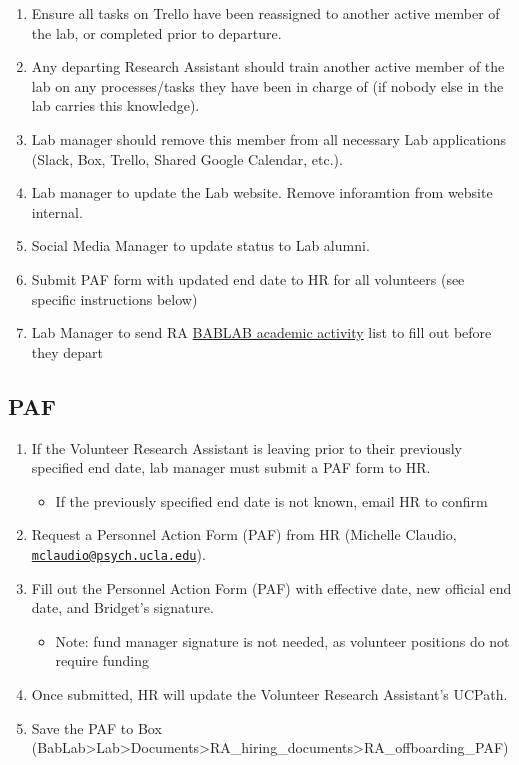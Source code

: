 \documentclass[]{book}
\providecommand{\tightlist}{%
  \setlength{\itemsep}{0pt}\setlength{\parskip}{0pt}}
\begin{document}
\begin{enumerate}
\def\labelenumi{\arabic{enumi}.}
\tightlist
\item
  Ensure all tasks on Trello have been reassigned to another active member of the lab, or completed prior to departure.
\item
  Any departing Research Assistant should train another active member of the lab on any processes/tasks they have been in charge of (if nobody else in the lab carries this knowledge).
\item
  Lab manager should remove this member from all necessary Lab applications (Slack, Box, Trello, Shared Google Calendar, etc.).
\item
  Lab manager to update the Lab website. Remove inforamtion from website internal.
\item
  Social Media Manager to update status to Lab alumni.
\item
  Submit PAF form with updated end date to HR for all volunteers (see specific instructions below)
\item
  Lab Manager to send RA \href{https://docs.google.com/spreadsheets/d/1BDrPZkQR2k0A2yIzCgjrRj-ve8a-tWYQdN2QSSsppbQ/edit?usp=sharing}{BABLAB academic activity} list to fill out before they depart
\end{enumerate}

\hypertarget{paf}{%
\subsection{PAF}\label{paf}}

\begin{enumerate}
\def\labelenumi{\arabic{enumi}.}
\tightlist
\item
  If the Volunteer Research Assistant is leaving prior to their previously specified end date, lab manager must submit a PAF form to HR.

  \begin{itemize}
  \tightlist
  \item
    If the previously specified end date is not known, email HR to confirm
  \end{itemize}
\item
  Request a Personnel Action Form (PAF) from HR (Michelle Claudio, \href{mailto:mclaudio@psych.ucla.edu}{\nolinkurl{mclaudio@psych.ucla.edu}}).
\item
  Fill out the Personnel Action Form (PAF) with effective date, new official end date, and Bridget's signature.

  \begin{itemize}
  \tightlist
  \item
    Note: fund manager signature is not needed, as volunteer positions do not require funding
  \end{itemize}
\item
  Once submitted, HR will update the Volunteer Research Assistant's UCPath.
\item
  Save the PAF to Box (BabLab\textgreater{}Lab\textgreater{}Documents\textgreater{}RA\_hiring\_documents\textgreater{}RA\_offboarding\_PAF)
\end{enumerate}
\end{document}
